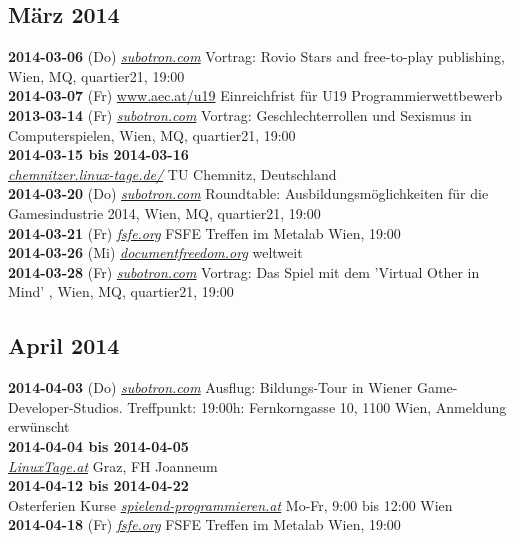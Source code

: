 \documentclass[10pt,a4paper,ngerman,twoside]{article} %
\begin{document}
\subsection*{März 2014}
\textbf{2014-03-06} (Do) \href{http://subotron.com/veranstaltung/rovio-stars/}{\textit{subotron.com}} Vortrag: Rovio Stars and free-to-play publishing, Wien, MQ, quartier21, 19:00\\
\textbf{2014-03-07} (Fr) \href{http://www.aec.at/u19/2012/03/08/article-3/}{www.aec.at/u19} Einreichfrist für U19 Programmierwettbewerb\\
\textbf{2013-03-14} (Fr) \href{http://subotron.com/veranstaltung/sexsim/}{\textit{subotron.com}} Vortrag: Geschlechterrollen und Sexismus in Computerspielen, Wien, MQ, quartier21, 19:00\\
\textbf{2014-03-15 bis 2014-03-16}\\ \href{http://chemnitzer.linux-tage.de/2014/de/info/}{\textit{chemnitzer.linux-tage.de/}} TU Chemnitz, Deutschland\\
\textbf{2014-03-20} (Do) \href{http://subotron.com/veranstaltung/ausbildung-2014/}{\textit{subotron.com}} Roundtable: Ausbildungsmöglichkeiten für die Gamesindustrie 2014, Wien, MQ, quartier21, 19:00\\
\textbf{2014-03-21} (Fr) \href{http://fsfe.org}{\textit{fsfe.org}} FSFE Treffen im Metalab Wien, 19:00\\ 
\textbf{2014-03-26} (Mi) \href{http://www.documentfreedom.org/}{\textit{documentfreedom.org}} weltweit\\
\textbf{2014-03-28} (Fr) \href{http://subotron.com/veranstaltung/virtual-other/}{\textit{subotron.com}} Vortrag: Das Spiel mit dem 'Virtual Other in Mind' , Wien, MQ, quartier21, 19:00\\
\subsection*{April 2014}
\textbf{2014-04-03} (Do) \href{http://subotron.com/veranstaltung/bildungstour-2/}{\textit{subotron.com}} Ausflug: Bildungs-Tour in Wiener Game-Developer-Studios. Treffpunkt: 19:00h: Fernkorngasse 10, 1100 Wien, Anmeldung erwünscht\\
\textbf{2014-04-04 bis 2014-04-05}\\ \href{http://linuxtage.at/}{\textit{LinuxTage.at}} Graz, FH Joanneum\\
\textbf{2014-04-12 bis 2014-04-22}\\ Osterferien Kurse \href{http://spielend-programmieren.at}{\textit{spielend-programmieren.at}} Mo-Fr, 9:00 bis 12:00 Wien\\
\textbf{2014-04-18} (Fr) \href{http://fsfe.org}{\textit{fsfe.org}} FSFE Treffen im Metalab Wien, 19:00\\
\end{document}
